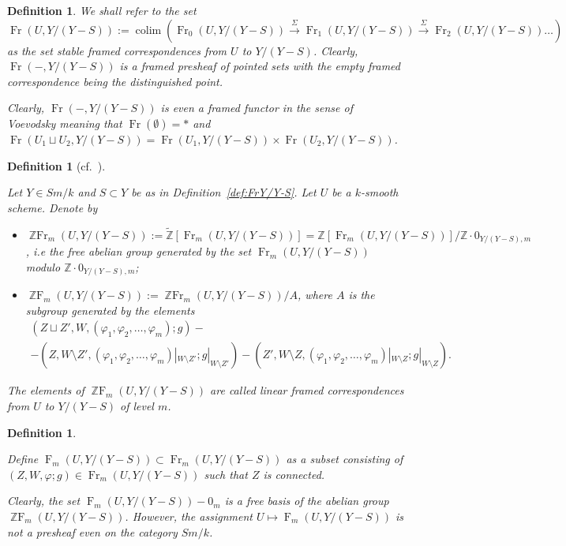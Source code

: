 \documentclass[a4paper,11pt,reqno]{amsart}
\newtheorem{definition}[theorem]{Definition}
\begin{document}
\begin{definition}{\rm
We shall refer to the set
\[
{\operatorname{Fr}}(U,Y/(Y-S)):=\operatorname{colim}({\operatorname{Fr}}_0(U,Y/(Y-S))\xrightarrow{\Sigma}{\operatorname{Fr}}_1(U,Y/(Y-S))
\xrightarrow{\Sigma} {\operatorname{Fr}}_2(U,Y/(Y-S)) \dots)
\]
as the \textit{set stable framed correspondences from $U$ to
$Y/(Y-S)$}. Clearly, ${\operatorname{Fr}}(-,Y/(Y-S))$ is a framed presheaf of
pointed sets with the empty framed correspondence being the
distinguished point.

Clearly, ${\operatorname{Fr}}(-,Y/(Y-S))$ is even a framed functor in the sense of
Voevodsky \cite{V2} meaning that ${\operatorname{Fr}}(\emptyset)=*$ and
${\operatorname{Fr}}(U_1\sqcup U_2,Y/(Y-S))={\operatorname{Fr}}(U_1,Y/(Y-S))\times
{\operatorname{Fr}}(U_2,Y/(Y-S))$.

}\end{definition}

\begin{definition}[cf.~\cite{GP1,GP3}]\label{stab}{\rm
 Let $Y\in Sm/k$ and $S\subset Y$ be as in Definition~\ref{def:FrY/Y-S}. Let $U$ be a $k$-smooth scheme. Denote by
\begin{itemize}
\item[$\diamond$]
${\operatorname{\mathbb{Z}Fr}}_m(U,Y/(Y-S)):=\widetilde{\mathbb{Z}}[{\operatorname{Fr}}_m(U,Y/(Y-S))]=\mathbb{Z}[{\operatorname{Fr}}_m(U,Y/(Y-S))]/\mathbb{Z}\cdot 0_{Y/(Y-S),m}$,
i.e the free abelian group generated by the set ${\operatorname{Fr}}_m(U,Y/(Y-S))$
modulo $\mathbb{Z}\cdot 0_{Y/(Y-S),m}$;

\item[$\diamond$]
${\operatorname{\mathbb{Z}F}}_m(U,Y/(Y-S)):={\operatorname{\mathbb{Z}Fr}}_m(U,Y/(Y-S))/A$, where $A$ is the subgroup
generated by the elements
\begin{multline*}
(Z\sqcup Z', W,(\varphi_1,\varphi_2,\dots,\varphi_m);g) - \\
-(Z, W\setminus
Z',(\varphi_1,\varphi_2,\dots,\varphi_m)|_{W\setminus
Z'};g|_{W\setminus Z'}) - (Z',{W\setminus
Z},(\varphi_1,\varphi_2,\dots,\varphi_m)|_{W\setminus
Z};g|_{W\setminus Z}).
\end{multline*}
\end{itemize}
The elements of ${\operatorname{\mathbb{Z}F}}_m(U,Y/(Y-S))$ are called {\it linear framed
correspondences from $U$ to $Y/(Y-S)$ of level $m$}.
}
\end{definition}

\begin{definition}\label{F_m_U_Y/(Y-S)}{\rm
Define ${\operatorname{F}}_m(U,Y/(Y-S))\subset {\operatorname{Fr}}_m(U,Y/(Y-S))$ as a subset consisting of
$(Z,W,{\varphi};g)\in {\operatorname{Fr}}_m(U,Y/(Y-S))$ such that $Z$ is connected.

Clearly, the set ${\operatorname{F}}_m(U,Y/(Y-S))-0_m$ is a free basis of the abelian group
${\operatorname{\mathbb{Z}F}}_m(U,Y/(Y-S))$. However, the assignment $U\mapsto {\operatorname{F}}_m(U,Y/(Y-S))$
is not a presheaf even on the category $Sm/k$.
}
\end{definition}
\end{document}
